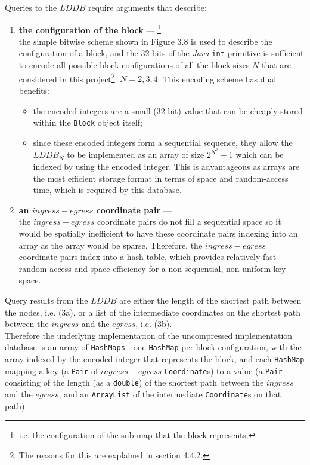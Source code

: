 \documentclass[12pt,notitlepage]{report}
\begin{document}
\noindent
Queries to the $LDDB$ require arguments that describe:
\begin{enumerate} 
\item{\bfseries the configuration of the block} --- \footnote{i.e. the configuration of the sub-map that the block represents.}\\
the simple bitwise scheme shown in Figure 3.8 is used to describe the configuration of a block, and the 32 bits of the {\em Java} {\tt int} primitive is sufficient to encode all possible block configurations of all the block sizes $N$ that are considered in this project\footnote{The reasons for this are explained in section 4.4.2.}: $N=2, 3, 4$. This encoding scheme has dual benefits:
\begin{itemize}
\item the encoded integers are a small (32 bit) value that can be cheaply stored within the {\tt Block} object itself;
\item since these encoded integers form a sequential sequence, they allow the $LDDB_{N}$ to be implemented as an array of size $2^{N^{2}}-1$ which can be indexed by using the encoded integer. This is advantageous as arrays are the most efficient storage format in terms of space and random-access time, which is required by this database.
\end{itemize}


\item{\bfseries an $ingress-egress$ coordinate pair} ---\\
the $ingress-egress$ coordinate pairs do not fill a sequential space so it would be spatially inefficient to have these coordinate pairs indexing into an array as the array would be sparse. Therefore, the $ingress-egress$ coordinate pairs index into a hash table, which provides relatively fast random access and space-efficiency for a non-sequential, non-uniform key space.\\

\end{enumerate}

\noindent
Query results from the $LDDB$ are either the length of the shortest path between the nodes, i.e. (3a), or a list of the intermediate coordinates on the shortest path between the $ingress$ and the $egress$, i.e. (3b).\\

\noindent
Therefore the underlying implementation of the uncompressed implementation database is an array of {\tt  HashMaps} - one {\tt HashMap} per block configuration, with the array indexed by the encoded integer that represents the block, and each {\tt HashMap} mapping a key (a {\tt Pair} of $ingress-egress$ {\tt Coordinate}s) to a value (a {\tt Pair} consisting of the length (as a {\tt double}) of the shortest path between the $ingress$ and the $egress$, and an {\tt ArrayList} of the intermediate {\tt Coordinate}s on that path).\\
\end{document}
